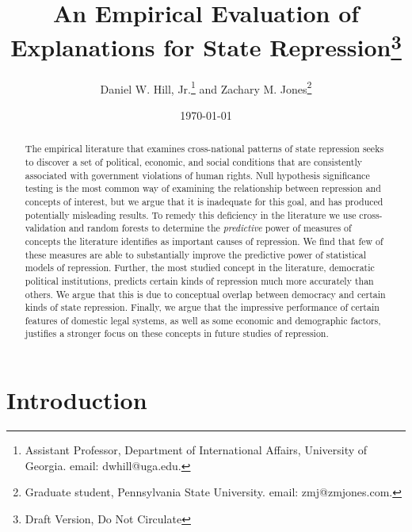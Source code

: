 \documentclass[12pt]{article}
\begin{document}
\vspace{50mm}
\date{\today}
\title{An Empirical Evaluation of Explanations for State Repression\thanks{Draft Version, Do Not Circulate}}
\bigskip
\author{Daniel W. Hill, Jr.\thanks{Assistant Professor, Department of International Affairs,
University of Georgia. email: dwhill@uga.edu.} and Zachary M. Jones\thanks{Graduate student, Pennsylvania State University. email: zmj@zmjones.com.}}

\maketitle \thispagestyle{empty}

\clearpage
\onehalfspace

\begin{abstract}
The empirical literature that examines cross-national patterns of state repression seeks to discover a set of political, economic, and social conditions that are consistently associated with government violations of human rights. Null hypothesis significance testing is the most common way of examining the relationship  between repression and concepts of interest, but we argue that it is inadequate for this goal, and has produced potentially misleading results. To remedy this deficiency in the literature we use cross-validation and random forests to determine the {\em predictive} power of measures of concepts the literature identifies as important causes of repression. We find that few of these measures are able to substantially improve the predictive power of statistical models of repression. Further, the most studied concept in the literature, democratic political institutions, predicts certain kinds of repression much more accurately than others. We argue that this is due to conceptual overlap between democracy and certain kinds of state repression. Finally, we argue that the impressive performance of certain features of domestic legal systems, as well as some economic and demographic factors, justifies a stronger focus on these concepts in future studies of repression.
\end{abstract}

\clearpage

\section{Introduction}
\end{document}
